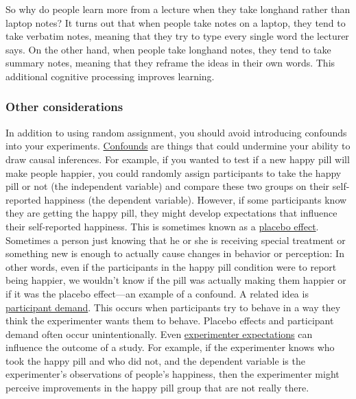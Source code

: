 \documentclass[
]{krantz}
\begin{document}
So why do people learn more from a lecture when they take longhand rather than laptop notes? It turns out that when people take notes on a laptop, they tend to take verbatim notes, meaning that they try to type every single word the lecturer says. On the other hand, when people take longhand notes, they tend to take summary notes, meaning that they reframe the ideas in their own words. This additional cognitive processing improves learning.

\hypertarget{other-considerations}{%
\subsubsection*{Other considerations}\label{other-considerations}}


In addition to using random assignment, you should avoid introducing confounds into your experiments. \protect\hyperlink{confounds}{Confounds} are things that could undermine your ability to draw causal inferences. For example, if you wanted to test if a new happy pill will make people happier, you could randomly assign participants to take the happy pill or not (the independent variable) and compare these two groups on their self-reported happiness (the dependent variable). However, if some participants know they are getting the happy pill, they might develop expectations that influence their self-reported happiness. This is sometimes known as a \protect\hyperlink{placebo-effect}{placebo effect}. Sometimes a person just knowing that he or she is receiving special treatment or something new is enough to actually cause changes in behavior or perception: In other words, even if the participants in the happy pill condition were to report being happier, we wouldn't know if the pill was actually making them happier or if it was the placebo effect---an example of a confound. A related idea is \protect\hyperlink{participant-demand}{participant demand}. This occurs when participants try to behave in a way they think the experimenter wants them to behave. Placebo effects and participant demand often occur unintentionally. Even \protect\hyperlink{experimenter-expectations}{experimenter expectations} can influence the outcome of a study. For example, if the experimenter knows who took the happy pill and who did not, and the dependent variable is the experimenter's observations of people's happiness, then the experimenter might perceive improvements in the happy pill group that are not really there.
\end{document}
